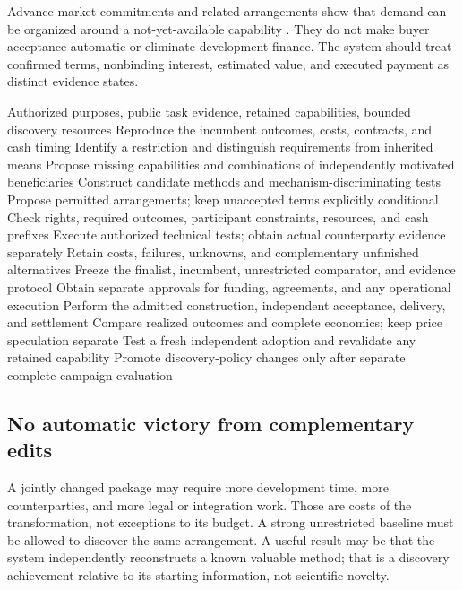 \documentclass[11pt,letterpaper]{article}
\theoremstyle{remark}\newtheorem{remark}{Remark}[section]
\begin{document}
Advance market commitments and related arrangements show that demand can be organized around a not-yet-available capability \citep{kremer2020}. They do not make buyer acceptance automatic or eliminate development finance. The system should treat confirmed terms, nonbinding interest, estimated value, and executed payment as distinct evidence states.

\begin{algorithm}[htbp]\small
\caption{Joint capability--arrangement discovery (proposed)}\label{alg:joint}
\begin{algorithmic}[1]
\Require Authorized purposes, public task evidence, retained capabilities, bounded discovery resources
\State Reproduce the incumbent outcomes, costs, contracts, and cash timing
\State Identify a restriction and distinguish requirements from inherited means
\State Propose missing capabilities and combinations of independently motivated beneficiaries
\State Construct candidate methods and mechanism-discriminating tests
\State Propose permitted arrangements; keep unaccepted terms explicitly conditional
  \State Check rights, required outcomes, participant constraints, resources, and cash prefixes
  \State Execute authorized technical tests; obtain actual counterparty evidence separately
  \State Retain costs, failures, unknowns, and complementary unfinished alternatives
\EndFor
\State Freeze the finalist, incumbent, unrestricted comparator, and evidence protocol
\State Obtain separate approvals for funding, agreements, and any operational execution
\State Perform the admitted construction, independent acceptance, delivery, and settlement
\State Compare realized outcomes and complete economics; keep price speculation separate
\State Test a fresh independent adoption and revalidate any retained capability
\State Promote discovery-policy changes only after separate complete-campaign evaluation
\end{algorithmic}
\end{algorithm}

\subsection{No automatic victory from complementary edits}
A jointly changed package may require more development time, more counterparties, and more legal or integration work. Those are costs of the transformation, not exceptions to its budget. A strong unrestricted baseline must be allowed to discover the same arrangement. A useful result may be that the system independently reconstructs a known valuable method; that is a discovery achievement relative to its starting information, not scientific novelty.
\end{document}

